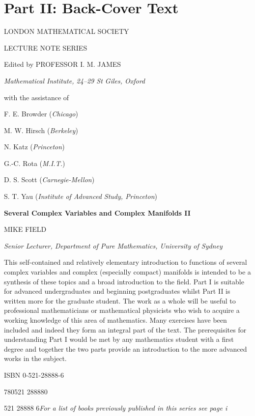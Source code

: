 \chapter*{Part II: Back-Cover Text}
\thispagestyle{empty}
\begin{center}
{\Large LONDON MATHEMATICAL SOCIETY\par LECTURE NOTE SERIES\par}
\end{center}
Edited by PROFESSOR I. M. JAMES\par
\emph{Mathematical Institute, 24--29 St Giles, Oxford}\par
\medskip
with the assistance of\par
F. E. Browder (\emph{Chicago})\par
M. W. Hirsch (\emph{Berkeley})\par
N. Katz (\emph{Princeton})\par
G.-C. Rota (\emph{M.I.T.})\par
D. S. Scott (\emph{Carnegie-Mellon})\par
S. T. Yau (\emph{Institute of Advanced Study, Princeton})\par
\bigskip
{\Large\bfseries Several Complex Variables and Complex Manifolds II\par}
\medskip
MIKE FIELD\par
\emph{Senior Lecturer, Department of Pure Mathematics, University of Sydney}\par
\bigskip
This self-contained and relatively elementary introduction to functions of several complex variables and complex (especially compact) manifolds is intended to be a synthesis of these topics and a broad introduction to the field. Part I is suitable for advanced undergraduates and beginning postgraduates whilst Part II is written more for the graduate student. The work as a whole will be useful to professional mathematicians or mathematical physicists who wish to acquire a working knowledge of this area of mathematics. Many exercises have been included and indeed they form an integral part of the text. The prerequisites for understanding Part I would be met by any mathematics student with a first degree and together the two parts provide an introduction to the more advanced works in the subject.
\par\vfill
\noindent ISBN 0-521-28888-6\par
{} 780521 288880\par
\medskip
{} 521 28888 6\hfill\emph{For a list of books previously published in this series see page i}

